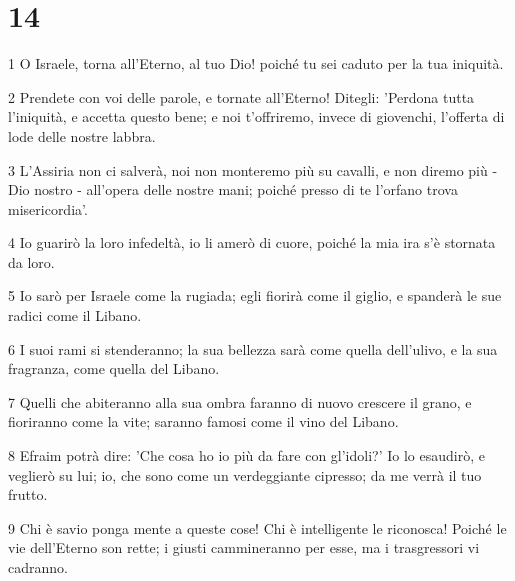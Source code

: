\chapter{14}

\par 1 O Israele, torna all'Eterno, al tuo Dio! poiché tu sei caduto per la tua iniquità.
\par 2 Prendete con voi delle parole, e tornate all'Eterno! Ditegli: 'Perdona tutta l'iniquità, e accetta questo bene; e noi t'offriremo, invece di giovenchi, l'offerta di lode delle nostre labbra.
\par 3 L'Assiria non ci salverà, noi non monteremo più su cavalli, e non diremo più - Dio nostro - all'opera delle nostre mani; poiché presso di te l'orfano trova misericordia'.
\par 4 Io guarirò la loro infedeltà, io li amerò di cuore, poiché la mia ira s'è stornata da loro.
\par 5 Io sarò per Israele come la rugiada; egli fiorirà come il giglio, e spanderà le sue radici come il Libano.
\par 6 I suoi rami si stenderanno; la sua bellezza sarà come quella dell'ulivo, e la sua fragranza, come quella del Libano.
\par 7 Quelli che abiteranno alla sua ombra faranno di nuovo crescere il grano, e fioriranno come la vite; saranno famosi come il vino del Libano.
\par 8 Efraim potrà dire: 'Che cosa ho io più da fare con gl'idoli?' Io lo esaudirò, e veglierò su lui; io, che sono come un verdeggiante cipresso; da me verrà il tuo frutto.
\par 9 Chi è savio ponga mente a queste cose! Chi è intelligente le riconosca! Poiché le vie dell'Eterno son rette; i giusti cammineranno per esse, ma i trasgressori vi cadranno.


